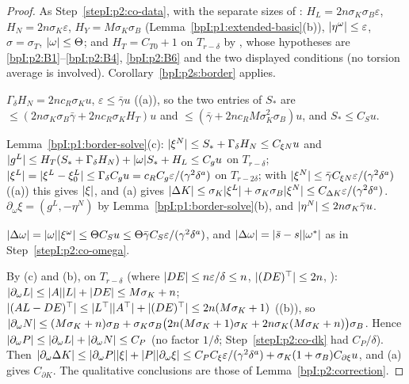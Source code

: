 \begin{proof}
\label{stepI:p2s:co-data}
As Step~\ref{stepI:p2:co-data}, with the separate sizes of : $H_L=2n\sigma_K\sigma_B\varepsilon$, $H_N=2n\sigma_K\varepsilon$,
$H_Y=M\sigma_K\sigma_B$ (Lemma~\ref{bpI:p1:extended-basic}(b)), $\lvert \eta^\omega\rvert\le\varepsilon$, $\sigma=\sigma_T$, $\lvert \omega\rvert\le\Theta$; and
$H_T=C_{T0}+1$ on $T_{r-\delta}$ by , whose hypotheses are \ref{bpI:p2:B1}--\ref{bpI:p2:B4}, \ref{bpI:p2:B6} and the
two displayed conditions (no torsion average is involved). Corollary~\ref{bpI:p2s:border} applies.

\label{stepI:p2s:co-s}
$\Gamma_\delta H_N=2nc_R\sigma_Ku$, $\varepsilon\le\bar\gamma u$ ((a)), so the two entries of $S_*$ are
$\le(2n\sigma_K\sigma_B\bar\gamma+2nc_R\sigma_KH_T)u$ and $\le(\bar\gamma+2nc_RM\sigma_K^2\sigma_B)u$, and $S_*\le C_Su$.

\label{stepI:p2s:co-xi}
Lemma~\ref{bpI:p1:border-solve}(c): $\lvert \xi^N\rvert\le S_*+\Gamma_\delta H_N\le C_{\xi N}u$ and $\lvert g^L\rvert\le H_T(S_*+\Gamma_\delta H_N)+\lvert \omega\rvert S_*+H_L\le C_gu$
on $T_{r-\delta}$; $\lvert \xi^L\rvert=\lvert \xi^L-\xi^L_0\rvert\le\Gamma_\delta C_gu=c_RC_g\varepsilon/(\gamma^2\delta^a)$ on $T_{r-2\delta}$; with
$\lvert \xi^N\rvert\le\bar\gamma C_{\xi N}\varepsilon/(\gamma^2\delta^a)$ ((a)) this gives $\lvert \xi\rvert$, and (a) gives
$\lvert \Delta K\rvert\le\sigma_K\lvert \xi^L\rvert+\sigma_K\sigma_B\lvert \xi^N\rvert\le C_{\Delta K}\varepsilon/(\gamma^2\delta^a)$. $\partial_\omega\xi=(g^L,-\eta^N)$ by
Lemma~\ref{bpI:p1:border-solve}(b), and $\lvert \eta^N\rvert\le2n\sigma_K\bar\gamma u$.

\label{stepI:p2s:co-om}
$\lvert \Delta\omega\rvert=\lvert \omega\rvert\lvert \xi^\omega\rvert\le\Theta C_Su\le\Theta\bar\gamma C_S\varepsilon/(\gamma^2\delta^a)$, and $\lvert \Delta\omega\rvert=\lvert \bar s-s\rvert\lvert \omega^*\rvert$ as in
Step~\ref{stepI:p2:co-omega}.

\label{stepI:p2s:co-dk}
By (c) and (b), on $T_{r-\delta}$ (where $\lvert DE\rvert\le n\varepsilon/\delta\le n$,
$\lvert (DE)^\top\rvert\le2n$, ): $\lvert \partial_\omega L\rvert\le\lvert A\rvert\lvert L\rvert+\lvert DE\rvert\le M\sigma_K+n$; $\lvert (AL-DE)^\top\rvert\le\lvert L^\top\rvert\lvert A^\top\rvert
+\lvert (DE)^\top\rvert\le2n(M\sigma_K+1)$ ((b)), so
$\lvert \partial_\omega N\rvert\le(M\sigma_K+n)\sigma_B+\sigma_K\sigma_B\bigl(2n(M\sigma_K+1)\sigma_K+2n\sigma_K(M\sigma_K+n)\bigr)\sigma_B$. Hence
$\lvert \partial_\omega P\rvert\le\lvert \partial_\omega L\rvert+\lvert \partial_\omega N\rvert\le C_P$ (no factor $1/\delta$; Step~\ref{stepI:p2:co-dk} had $C_P/\delta$). Then
$\lvert \partial_\omega\Delta K\rvert\le\lvert \partial_\omega P\rvert\lvert \xi\rvert+\lvert P\rvert\lvert \partial_\omega\xi\rvert\le C_PC_\xi\varepsilon/(\gamma^2\delta^a)+\sigma_K(1+\sigma_B)C_{\partial\xi}u$, and
(a) gives $C_{\partial K}$. The qualitative conclusions are those of Lemma~\ref{bpI:p2:correction}.
\end{proof}

